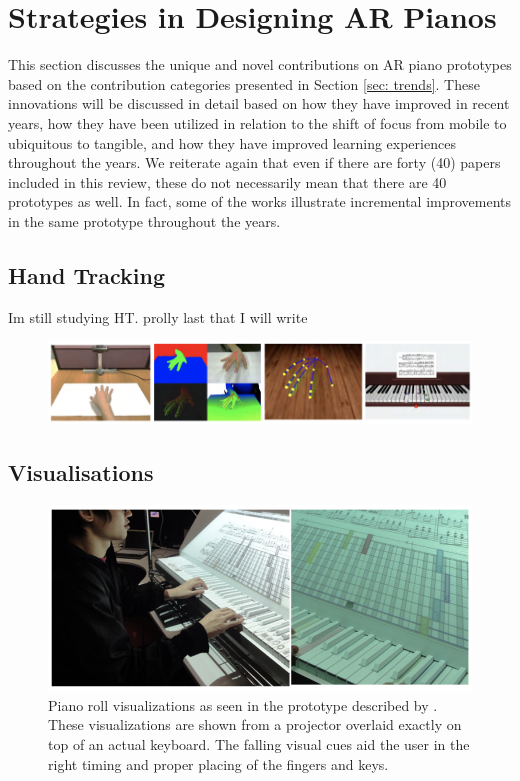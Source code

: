 \documentclass[manuscript,screen]{acmart}
\begin{document}
\section{Strategies in Designing AR Pianos}
\label{sec: strat}

This section discusses the unique and novel contributions on AR piano prototypes based on the contribution categories presented in Section \ref{sec: trends}. These innovations will be discussed in detail based on how they have improved in recent years, how they have been utilized in relation to the shift of focus from mobile to ubiquitous to tangible, and how they have improved learning experiences throughout the years. We reiterate again that even if there are forty (40) papers included in this review, these do not necessarily mean that there are 40 prototypes as well. In fact, some of the works illustrate incremental improvements in the same prototype throughout the years. 
\subsection{Hand Tracking}
\label{subsec: ht}
Im still studying HT. prolly last that I will write

\begin{figure}
    \centering
    \includegraphics[width=15cm]{figures/lianghandtrack.png}
    \caption{\cite{liang2016barehanded} }
    \label{fig:lianghandtrack}
\end{figure}

\subsection{Visualisations}
\label{subsec: viz}

\begin{figure}
    \centering
    \includegraphics[width=15cm]{figures/takegawapianoroll.png}
    \caption{Piano roll visualizations as seen in the prototype described by \citet{takegawa2012piano}. These visualizations are shown from a projector overlaid exactly on top of an actual keyboard. The falling visual cues aid the user in the right timing and proper placing of the fingers and keys.}
    \label{fig:takegawapianoroll}
\end{figure}
\end{document}
